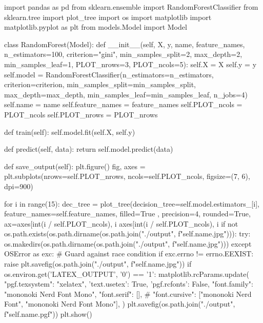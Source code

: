 \begin{latin}
  \begin{python}
import pandas as pd
from sklearn.ensemble import RandomForestClassifier
from sklearn.tree import plot_tree
import os
import matplotlib
import matplotlib.pyplot as plt
from models.Model import Model

class RandomForest(Model):
    def __init__(self, X, y, name, feature_names, n_estimators=100,
            criterion="gini", min_samples_split=2,
            max_depth=2, min_samples_leaf=1, PLOT_nrows=3, PLOT_ncols=5):
        self.X = X
        self.y = y
        self.model = RandomForestClassifier(n_estimators=n_estimators, criterion=criterion,
                min_samples_split=min_samples_split,
                max_depth=max_depth, min_samples_leaf=min_samples_leaf, n_jobs=4)
        self.name = name
        self.feature_names = feature_names
        self.PLOT_ncols = PLOT_ncols
        self.PLOT_nrows = PLOT_nrows

    def train(self):
        self.model.fit(self.X, self.y)

    def predict(self, data):
        return self.model.predict(data)

    def save_output(self):
        plt.figure()
        fig, axes = plt.subplots(nrows=self.PLOT_nrows, ncols=self.PLOT_ncols,
                figsize=(7, 6), dpi=900)

        for i in range(15):
            dec_tree = plot_tree(decision_tree=self.model.estimators_[i],
                    feature_names=self.feature_names,
                     filled=True , precision=4, rounded=True,
                     ax=axes[int(i / self.PLOT_ncols), i %
            axes[int(i / self.PLOT_ncols), i %
        if not os.path.exists(os.path.dirname(os.path.join("./output",
            f"{self.name}.jpg"))):
            try: os.makedirs(os.path.dirname(os.path.join("./output",
                f"{self.name}.jpg")))
            except OSError as exc: # Guard against race condition
                if exc.errno != errno.EEXIST:
                    raise
        plt.savefig(os.path.join("./output", f"{self.name}.jpg"))
        if os.environ.get('LATEX_OUTPUT', '0') == '1':
            matplotlib.rcParams.update({
                "pgf.texsystem": "xelatex",
                'text.usetex': True,
                'pgf.rcfonts': False,
                "font.family": "mononoki Nerd Font Mono",
                "font.serif": [],
                #  "font.cursive": ["mononoki Nerd Font", "mononoki Nerd Font Mono"],
            })
            plt.savefig(os.path.join("./output", f"{self.name}.pgf"))
        plt.show()

  \end{python}
\end{latin}


